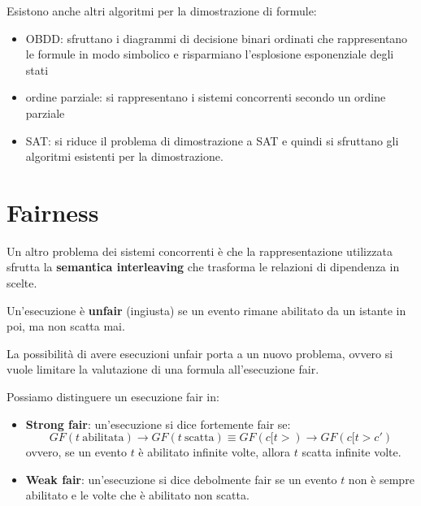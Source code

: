 Esistono anche altri algoritmi per la dimostrazione di formule:
\begin{itemize}
    \item OBDD: sfruttano i diagrammi di decisione binari ordinati che rappresentano
          le formule in modo simbolico e risparmiano l'esplosione esponenziale degli stati
    \item ordine parziale: si rappresentano i sistemi concorrenti secondo un ordine
          parziale
    \item SAT: si riduce il problema di dimostrazione a SAT e quindi si sfruttano
          gli algoritmi esistenti per la dimostrazione.
\end{itemize}

\section{Fairness}
Un altro problema dei sistemi concorrenti è che la rappresentazione utilizzata sfrutta
la \textbf{semantica interleaving} che trasforma le relazioni di dipendenza in scelte.

\begin{definizione}
    Un'esecuzione è \textbf{unfair} (ingiusta) se un evento rimane abilitato da
    un istante in poi, ma non scatta mai.
\end{definizione}
La possibilità di avere esecuzioni unfair porta a un nuovo problema, ovvero si
vuole limitare la valutazione di una formula all'esecuzione fair.

Possiamo distinguere un esecuzione fair in:
\begin{itemize}
    \item \textbf{Strong fair}: un'esecuzione si dice fortemente fair se:
          \begin{equation}
              GF(t \ \text{abilitata}) \to GF(t \ \text{scatta}) \equiv
              GF(c[t>) \to GF(c[t>c')
          \end{equation}
          ovvero, se un evento $t$ è abilitato infinite volte, allora $t$ scatta
          infinite volte.
    \item \textbf{Weak fair}: un'esecuzione si dice debolmente fair se un evento
          $t$ non è sempre abilitato e le volte che è abilitato non scatta.
\end{itemize}